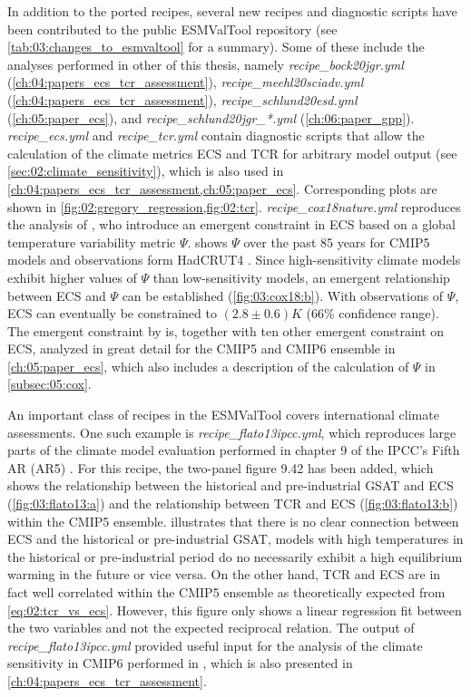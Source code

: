 In addition to the ported recipes, several new recipes and diagnostic scripts
have been contributed to the public \ac{ESMValTool} repository (see
\cref{tab:03:changes_to_esmvaltool} for a summary). Some of these include the
analyses performed in other  of this
thesis, namely \emph{recipe\_bock20jgr.yml}
(\cref{ch:04:papers_ecs_tcr_assessment}), \emph{recipe\_meehl20sciadv.yml}
(\cref{ch:04:papers_ecs_tcr_assessment}), \emph{recipe\_schlund20esd.yml}
(\cref{ch:05:paper_ecs}), and \emph{recipe\_schlund20jgr\_*.yml}
(\cref{ch:06:paper_gpp}). \emph{recipe\_ecs.yml} and \emph{recipe\_tcr.yml}
contain diagnostic scripts that allow the calculation of the climate metrics
\ac{ECS} and \ac{TCR} for arbitrary model output (see
\cref{sec:02:climate_sensitivity}), which is also used in
\cref{ch:04:papers_ecs_tcr_assessment,ch:05:paper_ecs}. Corresponding plots are
shown in \cref{fig:02:gregory_regression,fig:02:tcr}.
\emph{recipe\_cox18nature.yml} reproduces the analysis of \textcite{Cox2018},
who introduce an emergent constraint in \ac{ECS} based on a global temperature
variability metric $\Psi$.  shows $\Psi$ over the past 85
years for \acs{CMIP}5 models and observations form HadCRUT4
\autocite{Morice2012}. Since high-sensitivity climate models exhibit higher
values of $\Psi$ than low-sensitivity models, an emergent relationship between
\ac{ECS} and $\Psi$ can be established (\cref{fig:03:cox18:b}). With
observations of $\Psi$, \ac{ECS} can eventually be constrained to $\left( 2.8
\pm 0.6 \right) \unit{K}$ ($66 \unit{\%}$ confidence range). The emergent
constraint by \textcite{Cox2018} is, together with ten other emergent
constraint on \ac{ECS}, analyzed in great detail for the \acs{CMIP}5 and
\acs{CMIP}6 ensemble in \cref{ch:05:paper_ecs}, which also includes a
description of the calculation of $\Psi$ in \cref{subsec:05:cox}.

An important class of recipes in the \ac{ESMValTool} covers international
climate assessments. One such example is \emph{recipe\_flato13ipcc.yml}, which
reproduces large parts of the climate model evaluation performed in chapter 9
of the \ac{IPCC}'s Fifth \acl{AR} (\acs{AR}5) \autocite{Flato2013}. For this
recipe, the two-panel figure 9.42 has been added, which shows the relationship
between the historical and pre-industrial \ac{GSAT} and \ac{ECS}
(\cref{fig:03:flato13:a}) and the relationship between \ac{TCR} and \ac{ECS}
(\cref{fig:03:flato13:b}) within the \acs{CMIP}5 ensemble.
 illustrates that there is no clear connection between
\ac{ECS} and the historical or pre-industrial \ac{GSAT}, \ie{} models with high
temperatures in the historical or pre-industrial period do no necessarily
exhibit a high equilibrium warming in the future or vice versa. On the other
hand, \ac{TCR} and \ac{ECS} are in fact well correlated within the \acs{CMIP}5
ensemble as theoretically expected from \cref{eq:02:tcr_vs_ecs}. However, this
figure only shows a linear regression fit between the two variables and not the
expected reciprocal relation. The output of \emph{recipe\_flato13ipcc.yml}
provided useful input for the analysis of the climate sensitivity in
\acs{CMIP}6 performed in \textcite{Meehl2020}, which is also presented in
\cref{ch:04:papers_ecs_tcr_assessment}.


